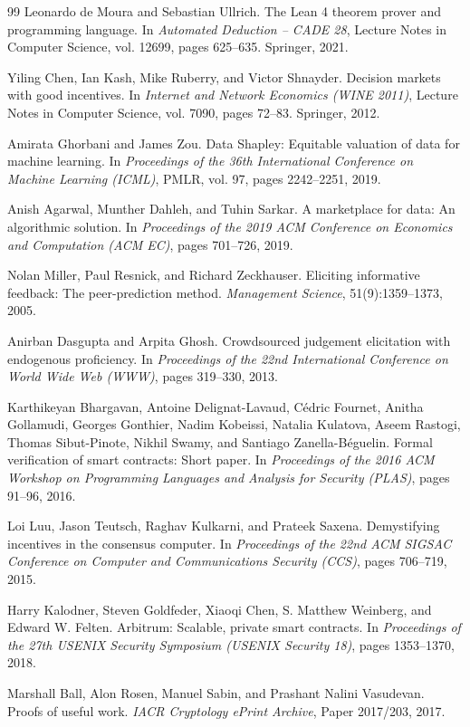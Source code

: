 \documentclass[runningheads,a4paper]{llncs}
\renewcommand{\_}{\textunderscore\allowbreak}
\begin{document}
\begin{thebibliography}{99}
Leonardo de Moura and Sebastian Ullrich.
\newblock The Lean 4 theorem prover and programming language.
\newblock In \emph{Automated Deduction -- CADE 28}, Lecture Notes in Computer Science, vol. 12699, pages 625--635. Springer, 2021.

Yiling Chen, Ian Kash, Mike Ruberry, and Victor Shnayder.
\newblock Decision markets with good incentives.
\newblock In \emph{Internet and Network Economics (WINE 2011)}, Lecture Notes in Computer Science, vol. 7090, pages 72--83. Springer, 2012.

Amirata Ghorbani and James Zou.
\newblock Data Shapley: Equitable valuation of data for machine learning.
\newblock In \emph{Proceedings of the 36th International Conference on Machine Learning (ICML)}, PMLR, vol. 97, pages 2242--2251, 2019.

Anish Agarwal, Munther Dahleh, and Tuhin Sarkar.
\newblock A marketplace for data: An algorithmic solution.
\newblock In \emph{Proceedings of the 2019 ACM Conference on Economics and Computation (ACM EC)}, pages 701--726, 2019.

Nolan Miller, Paul Resnick, and Richard Zeckhauser.
\newblock Eliciting informative feedback: The peer-prediction method.
\newblock \emph{Management Science}, 51(9):1359--1373, 2005.

Anirban Dasgupta and Arpita Ghosh.
\newblock Crowdsourced judgement elicitation with endogenous proficiency.
\newblock In \emph{Proceedings of the 22nd International Conference on World Wide Web (WWW)}, pages 319--330, 2013.

Karthikeyan Bhargavan, Antoine Delignat-Lavaud, C{\'e}dric Fournet, Anitha Gollamudi, Georges Gonthier, Nadim Kobeissi, Natalia Kulatova, Aseem Rastogi, Thomas Sibut-Pinote, Nikhil Swamy, and Santiago Zanella-B{\'e}guelin.
\newblock Formal verification of smart contracts: Short paper.
\newblock In \emph{Proceedings of the 2016 ACM Workshop on Programming Languages and Analysis for Security (PLAS)}, pages 91--96, 2016.

Loi Luu, Jason Teutsch, Raghav Kulkarni, and Prateek Saxena.
\newblock Demystifying incentives in the consensus computer.
\newblock In \emph{Proceedings of the 22nd ACM SIGSAC Conference on Computer and Communications Security (CCS)}, pages 706--719, 2015.

Harry Kalodner, Steven Goldfeder, Xiaoqi Chen, S. Matthew Weinberg, and Edward W. Felten.
\newblock Arbitrum: Scalable, private smart contracts.
\newblock In \emph{Proceedings of the 27th USENIX Security Symposium (USENIX Security 18)}, pages 1353--1370, 2018.

Marshall Ball, Alon Rosen, Manuel Sabin, and Prashant Nalini Vasudevan.
\newblock Proofs of useful work.
\newblock \emph{IACR Cryptology ePrint Archive}, Paper 2017/203, 2017.

\end{thebibliography}
\appendix
\end{document}
